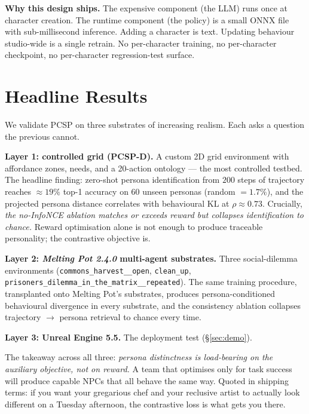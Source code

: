 \documentclass[11pt]{article}
\newcommand{\PCSP}{PCSP}
\newcommand{\PCSPD}{PCSP-D}
\begin{document}
\noindent\textbf{Why this design ships.}
The expensive component (the LLM) runs once at character creation.
The runtime component (the policy) is a small ONNX file with
sub-millisecond inference. Adding a character is text. Updating
behaviour studio-wide is a single retrain. No per-character training,
no per-character checkpoint, no per-character regression-test surface.

\section{Headline Results}
\label{sec:results}

We validate \PCSP{} on three substrates of increasing realism. Each
asks a question the previous cannot.

\noindent\textbf{Layer 1: controlled grid (\PCSPD{}).}
A custom 2D grid environment with affordance zones, needs, and a
20-action ontology --- the most controlled testbed. The headline
finding: zero-shot persona identification from $200$ steps of
trajectory reaches $\approx\!19\%$ top-1 accuracy on $60$ unseen
personas (random $=1.7\%$), and the projected persona distance
correlates with behavioural KL at $\rho \approx 0.73$. Crucially,
\emph{the no-InfoNCE ablation matches or exceeds reward but collapses
identification to chance.} Reward optimisation alone is not enough to
produce traceable personality; the contrastive objective is.

\noindent\textbf{Layer 2: \textit{Melting Pot 2.4.0} multi-agent
substrates.} Three social-dilemma environments
(\texttt{commons\_harvest\_\_open}, \texttt{clean\_up},
\texttt{prisoners\_dilemma\_in\_the\_matrix\_\_repeated}). The same
training procedure, transplanted onto Melting Pot's substrates,
produces persona-conditioned behavioural divergence in every
substrate, and the consistency ablation collapses trajectory
$\rightarrow$ persona retrieval to chance every time.

\noindent\textbf{Layer 3: Unreal Engine 5.5.}
The deployment test (\S\ref{sec:demo}).

The takeaway across all three: \emph{persona distinctness is
load-bearing on the auxiliary objective, not on reward.} A team that
optimises only for task success will produce capable NPCs that all
behave the same way. Quoted in shipping terms: if you want your
gregarious chef and your reclusive artist to actually look different
on a Tuesday afternoon, the contrastive loss is what gets you there.
\end{document}
